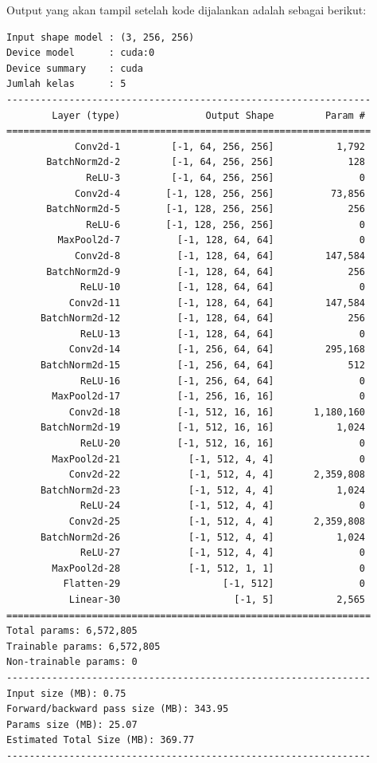 Output yang akan tampil setelah kode dijalankan adalah sebagai berikut:

\begin{outputcode}[H]
\begin{lstlisting}[language={}]
Input shape model : (3, 256, 256)
Device model      : cuda:0
Device summary    : cuda
Jumlah kelas      : 5
----------------------------------------------------------------
        Layer (type)               Output Shape         Param #
================================================================
            Conv2d-1         [-1, 64, 256, 256]           1,792
       BatchNorm2d-2         [-1, 64, 256, 256]             128
              ReLU-3         [-1, 64, 256, 256]               0
            Conv2d-4        [-1, 128, 256, 256]          73,856
       BatchNorm2d-5        [-1, 128, 256, 256]             256
              ReLU-6        [-1, 128, 256, 256]               0
         MaxPool2d-7          [-1, 128, 64, 64]               0
            Conv2d-8          [-1, 128, 64, 64]         147,584
       BatchNorm2d-9          [-1, 128, 64, 64]             256
             ReLU-10          [-1, 128, 64, 64]               0
           Conv2d-11          [-1, 128, 64, 64]         147,584
      BatchNorm2d-12          [-1, 128, 64, 64]             256
             ReLU-13          [-1, 128, 64, 64]               0
           Conv2d-14          [-1, 256, 64, 64]         295,168
      BatchNorm2d-15          [-1, 256, 64, 64]             512
             ReLU-16          [-1, 256, 64, 64]               0
        MaxPool2d-17          [-1, 256, 16, 16]               0
           Conv2d-18          [-1, 512, 16, 16]       1,180,160
      BatchNorm2d-19          [-1, 512, 16, 16]           1,024
             ReLU-20          [-1, 512, 16, 16]               0
        MaxPool2d-21            [-1, 512, 4, 4]               0
           Conv2d-22            [-1, 512, 4, 4]       2,359,808
      BatchNorm2d-23            [-1, 512, 4, 4]           1,024
             ReLU-24            [-1, 512, 4, 4]               0
           Conv2d-25            [-1, 512, 4, 4]       2,359,808
      BatchNorm2d-26            [-1, 512, 4, 4]           1,024
             ReLU-27            [-1, 512, 4, 4]               0
        MaxPool2d-28            [-1, 512, 1, 1]               0
          Flatten-29                  [-1, 512]               0
           Linear-30                    [-1, 5]           2,565
================================================================
Total params: 6,572,805
Trainable params: 6,572,805
Non-trainable params: 0
----------------------------------------------------------------
Input size (MB): 0.75
Forward/backward pass size (MB): 343.95
Params size (MB): 25.07
Estimated Total Size (MB): 369.77
----------------------------------------------------------------
\end{lstlisting}
\caption{Output ringkasan arsitektur model ResNet9}
\end{outputcode}

